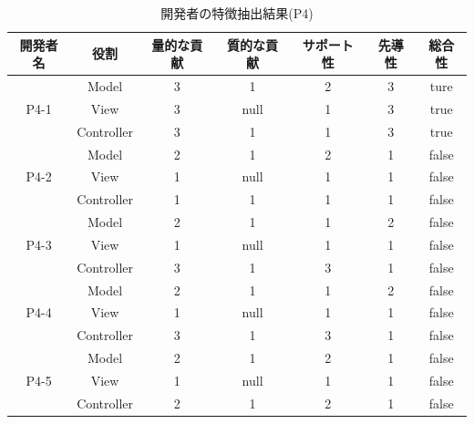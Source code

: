 \documentclass{funthesis}
\begin{document}
\begin{table}[htb]
  \begin{center}
\begin{tabular}{|c|c|c|c|c|c|c|}
\hline
開発者名 & 役割 & 量的な貢献 & 質的な貢献 & サポート性 & 先導性 & 総合性\\ \hline
& Model & 3 & 1 & 2 & 3 & ture\\ \cline{2-7}
P4-1 & View & 3 & null & 1 & 3 & true\\ \cline{2-7}
& Controller & 3 & 1 & 1 & 3 & true \\ \hline \hline

& Model & 2 & 1 & 2 & 1 & false\\ \cline{2-7}
P4-2 & View & 1 & null & 1 & 1 & false\\ \cline{2-7}
& Controller & 1 & 1 & 1 & 1 & false \\ \hline \hline

& Model & 2 & 1 & 1 & 2 & false\\ \cline{2-7}
P4-3 & View & 1 & null& 1 & 1 & false\\ \cline{2-7}
& Controller & 3 & 1 & 3 & 1 & false \\ \hline \hline

& Model & 2 & 1 & 1 & 2 & false\\ \cline{2-7}
P4-4 & View & 1 & null& 1 & 1 & false\\ \cline{2-7}
& Controller & 3 & 1 & 3 & 1 & false \\ \hline \hline

& Model & 2 & 1 & 2 & 1 & false\\ \cline{2-7}
P4-5 & View & 1 & null & 1 & 1 & false\\ \cline{2-7}
& Controller & 2 & 1 & 2 & 1 & false \\ \hline

\end{tabular}
  \end{center}
  \caption{開発者の特徴抽出結果(P4)}    \label{sample}
\end{table}
\end{document}
